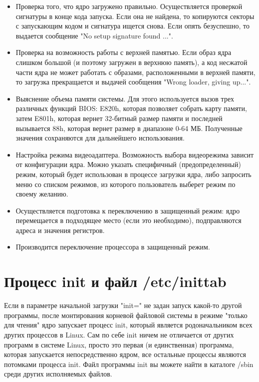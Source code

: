 \begin{itemize}
\item Проверка того, что ядро загружено правильно. Осуществляется проверкой сигнатуры в конце кода запуска. Если она не найдена, то копируются секторы с запускающим кодом и сигнатура ищется снова. Если опять безуспешно, то выдается сообщение "No setup signature found ...".
\item Проверка на возможность работы с верхней памятью. Если образ ядра слишком большой (и поэтому загружен в верхнюю память), а код несжатой части ядра не может работать с образами, расположенными в верхней памяти, то загрузка прекращается и выдачей сообщения "Wrong loader, giving up...".
\item Выяснение объема памяти системы. Для этого используется вызов трех различных функций BIOS: E820h, которая позволяет собрать карту памяти, затем E801h, которая вернет 32-битный размер памяти и последней вызывается 88h, которая вернет размер в диапазоне 0-64 МБ. Полученные значения сохраняются для дальнейшего использования.
\item Настройка режима видеоадаптера. Возможность выбора видеорежима зависит от конфигурации ядра. Можно указать специфичный (предопределенный) режим, который будет использован в процессе загрузки ядра, либо запросить меню со списком режимов, из которого пользователь выберет режим по своему желанию.
\item Осуществляется подготовка к переключению в защищенный режим: ядро перемещается в подходящее место (если это необходимо), подправляются адреса и значения регистров.
\item Производится переключение процессора в защищенный режим.
\end{itemize}

\newpage
\section{Процесс init и файл /etc/inittab}

Если в параметре начальной загрузки "init=" не задан запуск какой-то другой программы, после монтирования корневой файловой системы в режиме "только для чтения" ядро запускает процесс init, который является родоначальником всех других процессов в Linux. Сам по себе init ничем не отличается от других программ в системе Linux, просто это первая (и единственная) программа, которая запускается непосредственно ядром, все остальные процессы являются потомками процесса init. Файл программы init вы можете найти в каталоге /sbin среди других исполняемых файлов.

